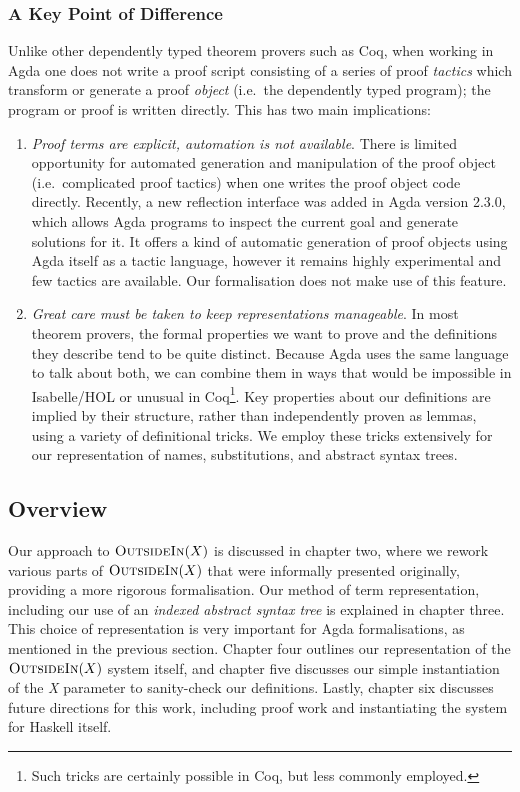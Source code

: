 \documentclass[a4paper]{jfp}
\newcommand{\outsidein}{\textsc{OutsideIn}(X)}
\begin{document}
\subsubsection{A Key Point of Difference}

Unlike other dependently typed theorem provers such as Coq, when working in Agda one does not write a proof script consisting of a series of proof
\emph{tactics} which transform or generate a proof \emph{object} (i.e.\ the dependently typed program); the program or proof is written directly. This
has two main implications:

\begin{enumerate}
   \item \emph{Proof terms are explicit, automation is not available}. There is limited opportunity for automated generation and manipulation of the
      proof object (i.e.\ complicated proof tactics) when one writes the proof object code directly. Recently, a new reflection interface was added in
      Agda version 2.3.0, which allows Agda programs to inspect the current goal and generate solutions for it. It offers a kind of automatic
      generation of proof objects using Agda itself as a tactic language, however it remains highly experimental and few tactics are available. Our
      formalisation does not make use of this feature.

   \item \emph{Great care must be taken to keep representations manageable}. In most theorem provers, the formal properties we want to prove and the
      definitions they describe tend to be quite distinct. Because Agda uses the same language to talk about both, we can combine them in ways that
      would be impossible in Isabelle/HOL or unusual in Coq\footnote{Such tricks are certainly possible in Coq, but less commonly employed.}. Key
      properties about our definitions are implied by their structure, rather than independently proven as lemmas, using a variety of definitional
      tricks. We employ these tricks extensively for our representation of names, substitutions, and abstract syntax trees. 

\end{enumerate}

\subsection{Overview}

Our approach to $\outsidein$ is discussed in chapter two, where we rework various parts of $\outsidein$ that were informally presented originally,
providing a more rigorous formalisation. Our method of term representation, including our use of an \emph{indexed abstract syntax tree} is explained
in chapter three.  This choice of representation is very important for Agda formalisations, as mentioned in the previous section. Chapter four
outlines our representation of the $\outsidein$ system itself, and chapter five discusses our simple instantiation of the \emph{X} parameter to
sanity-check our definitions. Lastly, chapter six discusses future directions for this work, including proof work and instantiating the system for
Haskell itself.
\end{document}
